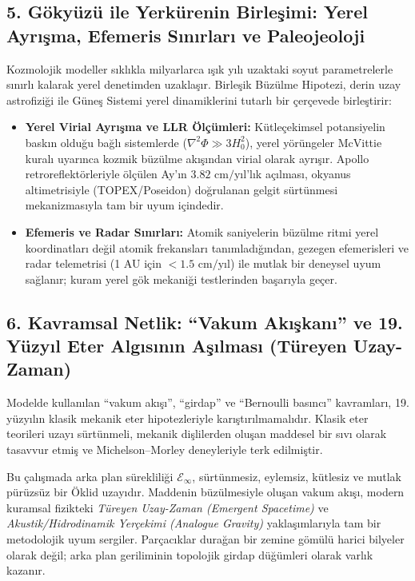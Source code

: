 \subsection*{5. Gökyüzü ile Yerkürenin Birleşimi: Yerel Ayrışma, Efemeris Sınırları ve Paleojeoloji}

Kozmolojik modeller sıklıkla milyarlarca ışık yılı uzaktaki soyut parametrelerle sınırlı kalarak yerel denetimden uzaklaşır. Birleşik Büzülme Hipotezi, derin uzay astrofiziği ile Güneş Sistemi yerel dinamiklerini tutarlı bir çerçevede birleştirir:
\begin{itemize}
    \item \textbf{Yerel Virial Ayrışma ve LLR Ölçümleri:} Kütleçekimsel potansiyelin baskın olduğu bağlı sistemlerde ($\nabla^2\Phi \gg 3H_0^2$), yerel yörüngeler McVittie kuralı uyarınca kozmik büzülme akışından virial olarak ayrışır. Apollo retroreflektörleriyle ölçülen Ay'ın $3.82\text{ cm/yıl}$'lık açılması, okyanus altimetrisiyle (TOPEX/Poseidon) doğrulanan gelgit sürtünmesi mekanizmasıyla tam bir uyum içindedir.
    \item \textbf{Efemeris ve Radar Sınırları:} Atomik saniyelerin büzülme ritmi yerel koordinatları değil atomik frekansları tanımladığından, gezegen efemerisleri ve radar telemetrisi (1 AU için $< 1.5\text{ cm/yıl}$) ile mutlak bir deneysel uyum sağlanır; kuram yerel gök mekaniği testlerinden başarıyla geçer.
\end{itemize}

\subsection*{6. Kavramsal Netlik: ``Vakum Akışkanı'' ve 19. Yüzyıl Eter Algısının Aşılması (Türeyen Uzay-Zaman)}

Modelde kullanılan ``vakum akışı'', ``girdap'' ve ``Bernoulli basıncı'' kavramları, 19. yüzyılın klasik mekanik eter hipotezleriyle karıştırılmamalıdır. Klasik eter teorileri uzayı sürtünmeli, mekanik dişlilerden oluşan maddesel bir sıvı olarak tasavvur etmiş ve Michelson--Morley deneyleriyle terk edilmiştir.

Bu çalışmada arka plan sürekliliği $\mathcal{E}_\infty$, sürtünmesiz, eylemsiz, kütlesiz ve mutlak pürüzsüz bir Öklid uzayıdır. Maddenin büzülmesiyle oluşan vakum akışı, modern kuramsal fizikteki \textit{Türeyen Uzay-Zaman (Emergent Spacetime)} ve \textit{Akustik/Hidrodinamik Yerçekimi (Analogue Gravity)} yaklaşımlarıyla tam bir metodolojik uyum sergiler. Parçacıklar durağan bir zemine gömülü harici bilyeler olarak değil; arka plan geriliminin topolojik girdap düğümleri olarak varlık kazanır.

